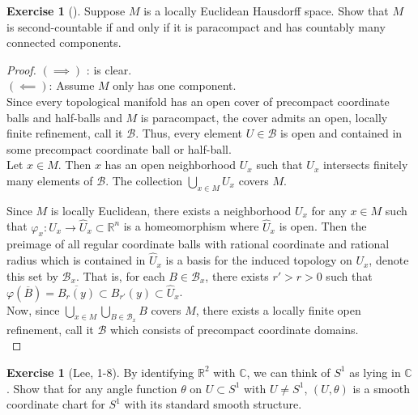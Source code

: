 \documentclass[reqno]{amsart}
\theoremstyle{plain}%
\theoremstyle{definition}
\newtheorem{exercise}[theorem]{Exercise}
\theoremstyle{remark}
\begin{document}
    \begin{exercise}[]
        Suppose $M$ is a locally Euclidean Hausdorff space.
        Show that $M$ is second-countable if and only if it is
        paracompact and has countably many connected components.
    \end{exercise}

    \begin{proof}
        $\left( \implies \right) $ : is clear.\\
        $\left( \impliedby \right) $: Assume $M$ only has one
        component.\\
        Since every topological manifold has an open cover of precompact
        coordinate balls and half-balls and $M$ is paracompact, the cover
        admits
        an open, locally finite refinement, call it $\mathcal{B}$. Thus, every
        element $U \in \mathcal{B}$ is open and contained in some
        precompact coordinate ball or half-ball.\\
        Let $x \in M$. Then $x$ has an open neighborhood $U_x$ such that
        $U_x$ intersects finitely many elements of $\mathcal{B}$. The
        collection $\bigcup_{x \in M} U_x$ covers $M$.
        
        \newpage
        Since $M$ is locally Euclidean, there exists a
        neighborhood $U_x$ for any $x \in M$ such that
        $\varphi_{x}  \colon U_x \to \hat{U}_x \subset \mathbb{R}^{n}$
        is a homeomorphism where $\hat{U}_x$ is open. Then
        the preimage of all regular 
        coordinate balls with rational coordinate
        and rational radius which is contained in $\hat{U}_x$ is
        a basis for the induced topology on $U_x$, denote this
        set by $\mathcal{B}_x$. That is, for each
        $B \in \mathcal{B}_x$, there exists $r' > r > 0$ such that
        $\varphi (\overline{B}) =
        \overline{B_r (y)} \subset B_{r'}(y) \subset \hat{U}_x$.\\
        Now, since
        $\bigcup_{x \in M} \bigcup_{B \in \mathcal{B}_x} B$ 
        covers $M$, there exists a locally finite open refinement,
        call it $\mathcal{B}$ which consists of precompact coordinate
        domains.\\
    \end{proof}

    \begin{exercise}[Lee, 1-8]
        By identifying $\mathbb{R}^2$ with $\mathbb{C}$, we can think of
        $S^{1}$ as lying in $\mathbb{C}$. Show that for any angle function
        $\theta$
        on $U \subset S^{1}$ with $U \neq S^{1}$, 
        $\left( U, \theta \right) $ is a smooth coordinate chart
        for $S^{1}$ with its standard smooth structure.
    \end{exercise}
\end{document}
